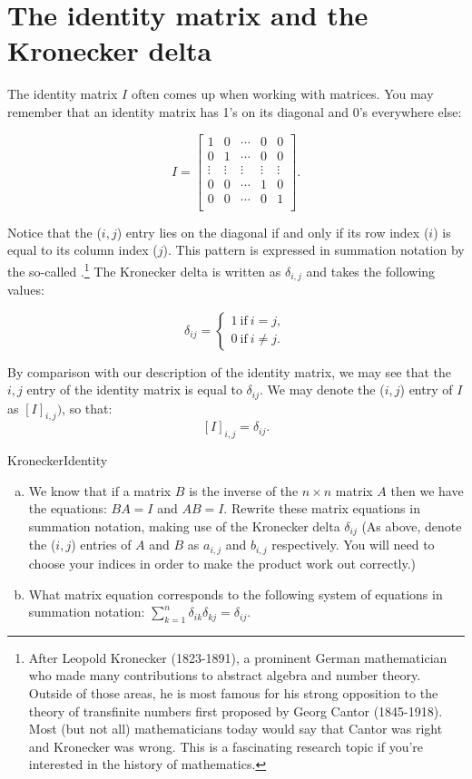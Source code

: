 \section{The identity matrix and the Kronecker delta}
\label{sec:SigmaApp:IdentityMatrixKroneckerDelta}

The identity matrix $I$ often comes up when working with matrices. You may remember that an identity matrix has 1's on its diagonal and 0's everywhere else:

\[I = \left[ \begin{array}{ccccc}
1 & 0  & \cdots & 0 & 0 \\
0 & 1  & \cdots & 0 & 0  \\
\vdots & \vdots & \vdots & \vdots & \vdots\\
0 & 0  & \cdots & 1 & 0  \\
0 & 0  & \cdots & 0 & 1  \\
 \end{array} \right]. \]

Notice that the ($i,j$) entry lies on the diagonal if and only if its row index ($i$) is equal to its column index ($j$).  This pattern is expressed in summation notation  by the so-called  
 .\footnote{After Leopold Kronecker (1823-1891), a prominent German mathematician who made many contributions to abstract algebra and number theory. Outside of those areas, he is most famous for his strong opposition to the theory of transfinite numbers first proposed by Georg Cantor (1845-1918).  Most (but not all) mathematicians today would say that Cantor was right and Kronecker was wrong. This is a fascinating research topic if you're interested in the history of mathematics.} The Kronecker delta is written as $\delta_{i,j}$ and takes the following values:

\[ \delta_{ij}=
\begin{cases}
1 ~ \text{if} ~ i=j,  \\
0 ~ \text{if} ~ i \neq j.
\end{cases} \]

By comparison with our description of the identity matrix, we may see that the $i,j$ entry of the identity matrix is equal to $\delta_{ij}$. We may denote the ($i,j$) entry of $I$ as $[I]_{i,j})$, so that:
\[  [I]_{i,j} = \delta_{ij}.\]

\begin{exercise}{KroneckerIdentity}
\begin{enumerate}[(a)]
\item
We know that if a matrix $B$ is the inverse of the $n \times n$ matrix $A$ then we have the equations: $BA = I$ and $AB = I$.  Rewrite these matrix equations in summation notation, making use of the Kronecker delta $\delta_{ij}$ (As above, denote the ($i,j$) entries of $A$ and $B$ as $a_{i,j}$ and $b_{i,j}$ respectively. You will need to choose your indices in order to make the product work out correctly.) 
\item
What matrix equation corresponds to the following system of equations in summation notation: $\displaystyle{ \sum_{k=1}^n  \delta_{ik}\delta_{kj}=\delta_{ij}}.$
\end{enumerate}
\end{exercise}

